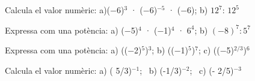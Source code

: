 \vspace{0.25cm}
\begin{autoaval}{30}
\begin{mylist}
\exer[2] Calcula el valor numèric: a)\quad ($-$6)${}^{3}$ · ($-$6)${}^{-5}$ · ($-$6);  \quad b) \quad  ${12}^{7}$: ${12}^{5}$
\answers{[$-\dfrac{1}{6}$, $144$]}

\exer[2]  Expressa com una potència:  a) \quad ($-$5)${}^{4}$ · ($-$1)${}^{4}$ · ${6}^{4}$;    \quad b)  \quad  $(-8)^7 : {5}^{7}$

\exer[2]  Expressa com una potència: a) (($-$2)${}^{5}$)${}^{3}$; \quad b)  \quad    (($-$1)${}^{5}$)${}^{7}$; \quad c)  \quad  (($-$5)${}^{2/3}$)${}^{6}$
\answers{[$(-2)^{15}$, $-1$, $(-5)^{4}$]}

\exer[2] Calcula el valor numèric: a) ( 5/3)${}^{-1}$; \, b)  (-1/3)${}^{-2}$;     \, c)      (- 2/5)${}^{-3}$


\end{mylist}
\end{autoaval}
